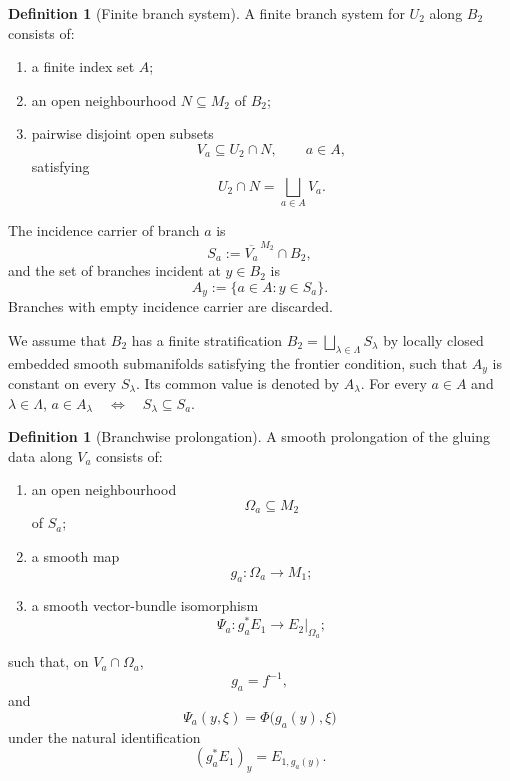 \documentclass[11pt]{article}
\theoremstyle{plain}
\theoremstyle{definition}
\newtheorem{definition}[theorem]{Definition}
\begin{document}
\begin{definition}[Finite branch system]
\label{def:finite-branch-system}
A finite branch system for \(U_2\) along \(B_2\) consists of:

\begin{enumerate}[label=\textup{(\roman*)}]
  \item a finite index set \(A\);

  \item an open neighbourhood \(N\subseteq M_2\) of \(B_2\);

  \item pairwise disjoint open subsets
        \[
          V_a\subseteq U_2\cap N,
          \qquad
          a\in A,
        \]
        satisfying
        \[
          U_2\cap N
          =
          \bigsqcup_{a\in A}V_a.
        \]
\end{enumerate}

The incidence carrier of branch \(a\) is
\[
  S_a
  :=
  \overline{V_a}^{\,M_2}\cap B_2,
\]
and the set of branches incident at \(y\in B_2\) is
\[
  A_y
  :=
  \{a\in A:y\in S_a\}.
\]
Branches with empty incidence carrier are discarded.
\end{definition}

We assume that \(B_2\) has a finite stratification \(B_2 = \bigsqcup_{\lambda\in\Lambda}S_\lambda\) by locally closed embedded smooth submanifolds satisfying the frontier
condition, such that \(A_y\) is constant on every \(S_\lambda\). Its
common value is denoted by
\(A_\lambda\).
For every \(a\in A\) and \(\lambda\in\Lambda\),
\(a\in A_\lambda \quad\Longleftrightarrow\quad S_\lambda\subseteq S_a\).

\begin{definition}[Branchwise prolongation]
\label{def:branchwise-prolongation}
A smooth prolongation of the gluing data along \(V_a\) consists of:

\begin{enumerate}[label=\textup{(\roman*)}]
  \item an open neighbourhood
        \[
          \Omega_a\subseteq M_2
        \]
        of \(S_a\);

  \item a smooth map
        \[
          g_a:\Omega_a\longrightarrow M_1;
        \]

  \item a smooth vector-bundle isomorphism
        \[
          \Psi_a:
          g_a^*E_1
          \longrightarrow
          E_2|_{\Omega_a};
        \]
\end{enumerate}
such that, on \(V_a\cap\Omega_a\),
\[
  g_a=f^{-1},
\]
and
\[
  \Psi_a(y,\xi)
  =
  \Phi\bigl(g_a(y),\xi\bigr)
\]
under the natural identification
\[
  (g_a^*E_1)_y=E_{1,g_a(y)}.
\]
\end{definition}
\end{document}

